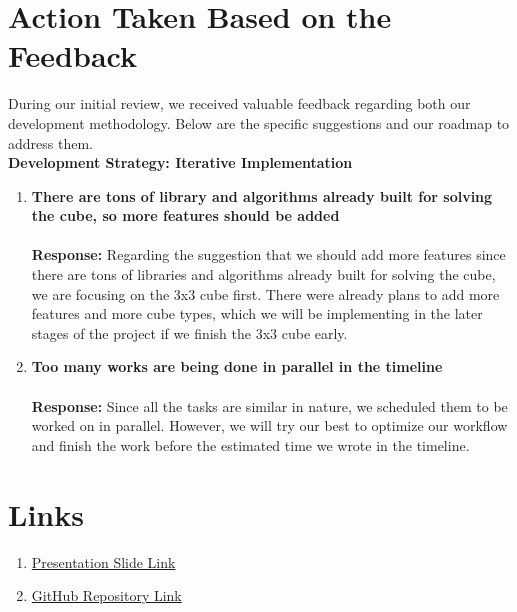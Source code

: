 \documentclass[12pt, a4paper]{article}
\begin{document}
\newpage
\section{Action Taken Based on the Feedback}

During our initial review, we received valuable feedback regarding both our development methodology. Below are the specific suggestions and our roadmap to address them.
\\

      \textbf{Development Strategy: Iterative Implementation} \\
\begin{enumerate}[label=\arabic*., itemsep=1.5em, topsep=5pt]
    
    \item \textbf{There are tons of library and algorithms already built for solving the cube, so more features should be added} \\ \\
    \textbf{Response:} Regarding the suggestion that we should add more features since there are tons of libraries and algorithms already built for solving the cube, we are focusing on the 3x3 cube first. There were already plans to add more features and more cube types, which we will be implementing in the later stages of the project if we finish the 3x3 cube early.

    \item \textbf{Too many works are being done in parallel in the timeline} \\ \\
    \textbf{Response:} Since all the tasks are similar in nature, we scheduled them to be worked on in parallel. However, we will try our best to optimize our workflow and finish the work before the estimated time we wrote in the timeline.
\end{enumerate}

\vspace{0.5cm}
\section{Links}
\begin{enumerate}[noitemsep, topsep=5pt]
    \item \href{https://drive.google.com/file/d/12vKdl9qTvfLmDFZV5v-CBeZkiBFru-QV/view?usp=sharing}{Presentation Slide Link}
    \item \href{https://github.com/SMTEmon/plastic-box-solver.git}{GitHub Repository Link}
\end{enumerate}
\end{document}
